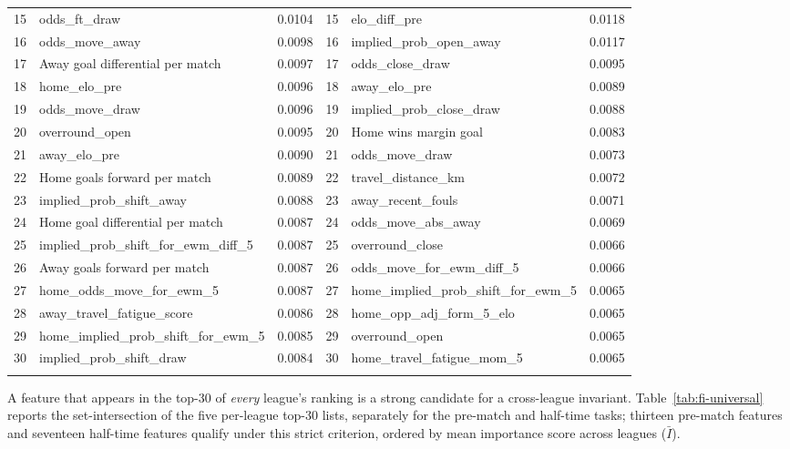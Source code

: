 \documentclass[pdflatex,sn-mathphys-num]{sn-jnl}
\theoremstyle{thmstyleone}
\theoremstyle{thmstyletwo}
\theoremstyle{thmstylethree}
\begin{document}
\begin{table}[h]
\begin{tabular*}{\textwidth}{@{\extracolsep\fill}rlc|rlc@{}}
15 & odds\_ft\_draw                     & 0.0104 & 15 & elo\_diff\_pre                          & 0.0118 \\
16 & odds\_move\_away                   & 0.0098 & 16 & implied\_prob\_open\_away               & 0.0117 \\
17 & Away goal differential per match   & 0.0097 & 17 & odds\_close\_draw                       & 0.0095 \\
18 & home\_elo\_pre                     & 0.0096 & 18 & away\_elo\_pre                          & 0.0089 \\
19 & odds\_move\_draw                   & 0.0096 & 19 & implied\_prob\_close\_draw              & 0.0088 \\
20 & overround\_open                    & 0.0095 & 20 & Home wins margin goal                   & 0.0083 \\
21 & away\_elo\_pre                     & 0.0090 & 21 & odds\_move\_draw                        & 0.0073 \\
22 & Home goals forward per match       & 0.0089 & 22 & travel\_distance\_km                    & 0.0072 \\
23 & implied\_prob\_shift\_away           & 0.0088 & 23 & away\_recent\_fouls                     & 0.0071 \\
24 & Home goal differential per match   & 0.0087 & 24 & odds\_move\_abs\_away                   & 0.0069 \\
25 & implied\_prob\_shift\_for\_ewm\_diff\_5 & 0.0087 & 25 & overround\_close                       & 0.0066 \\
26 & Away goals forward per match       & 0.0087 & 26 & odds\_move\_for\_ewm\_diff\_5           & 0.0066 \\
27 & home\_odds\_move\_for\_ewm\_5        & 0.0087 & 27 & home\_implied\_prob\_shift\_for\_ewm\_5  & 0.0065 \\
28 & away\_travel\_fatigue\_score        & 0.0086 & 28 & home\_opp\_adj\_form\_5\_elo            & 0.0065 \\
29 & home\_implied\_prob\_shift\_for\_ewm\_5 & 0.0085 & 29 & overround\_open                        & 0.0065 \\
30 & implied\_prob\_shift\_draw           & 0.0084 & 30 & home\_travel\_fatigue\_mom\_5           & 0.0065 \\
\botrule
\end{tabular*}
\end{table}

A feature that appears in the top-30 of \emph{every} league's ranking
is a strong candidate for a cross-league invariant.
Table~\ref{tab:fi-universal} reports the set-intersection of the five
per-league top-30 lists, separately for the pre-match and half-time
tasks; thirteen pre-match features and seventeen half-time features
qualify under this strict criterion, ordered by mean importance score
across leagues ($\bar I$).
\end{document}
